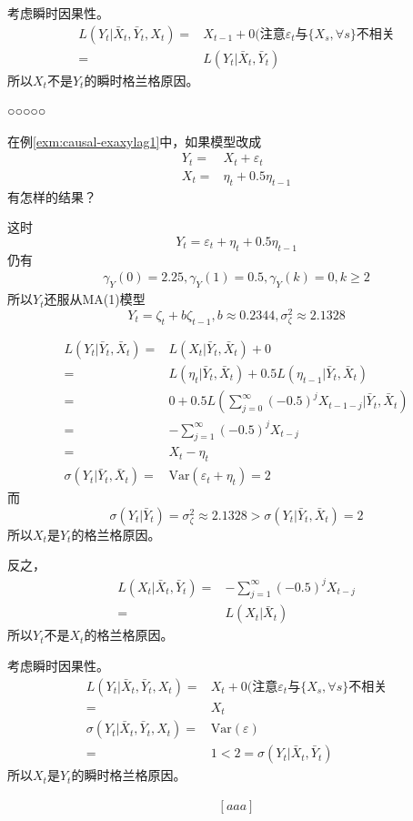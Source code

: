 \documentclass[]{book}
\theoremstyle{definition}
\theoremstyle{definition}
\theoremstyle{definition}
\theoremstyle{remark}
\let\BeginKnitrBlock\begin \let\EndKnitrBlock\end
\begin{document}
考虑瞬时因果性。 \[\begin{aligned}
L(Y_t | \bar X_t, \bar Y_t, X_t)
=& X_{t-1} + 0 (\text{注意}\varepsilon_t\text{与}\{X_s, \forall s\}\text{不相关} \\
=& L(Y_t | \bar X_t, \bar Y_t)
\end{aligned}\] 所以\(X_t\)不是\(Y_t\)的瞬时格兰格原因。

○○○○○

\BeginKnitrBlock{example}
\protect\hypertarget{exm:causal-exaxylag2}{}{\label{exm:causal-exaxylag2}
}在例\ref{exm:causal-exaxylag1}中，如果模型改成 \[\begin{aligned}
Y_t =& X_{t} + \varepsilon_t \\
X_t =& \eta_t + 0.5 \eta_{t-1}
\end{aligned}\] 有怎样的结果？
\EndKnitrBlock{example}

这时 \[
Y_t = \varepsilon_t + \eta_t + 0.5 \eta_{t-1}
\] 仍有 \[\begin{aligned}
\gamma_Y(0) = 2.25,
\gamma_Y(1) = 0.5,
\gamma_Y(k) = 0, k \geq 2
\end{aligned}\] 所以\(Y_t\)还服从MA(1)模型 \[
Y_t = \zeta_t + b \zeta_{t-1},
b \approx 0.2344,
\sigma^2_\zeta \approx 2.1328
\]

\[\begin{aligned}
L(Y_t | \bar Y_t, \bar X_t)
=& L(X_t | \bar Y_t, \bar X_t) + 0 \\
=& L(\eta_t | \bar Y_t, \bar X_t)
+ 0.5 L(\eta_{t-1} | \bar Y_t, \bar X_t) \\
=& 0 + 0.5 L(\sum_{j=0}^\infty (-0.5)^j X_{t-1-j} | \bar Y_t, \bar X_t) \\
=& - \sum_{j=1}^\infty (-0.5)^j X_{t-j} \\
=& X_t - \eta_t \\
\sigma(Y_t | \bar Y_t, \bar X_t) 
=& \text{Var}(\varepsilon_t + \eta_t) = 2
\end{aligned}\] 而 \[
\sigma(Y_t | \bar Y_t)
= \sigma^2_\zeta \approx 2.1328
> \sigma(Y_t | \bar Y_t, \bar X_t) = 2
\] 所以\(X_t\)是\(Y_t\)的格兰格原因。

反之， \[\begin{aligned}
L(X_t | \bar X_t, \bar Y_t)
=& - \sum_{j=1}^\infty (-0.5)^j X_{t-j} \\
=& L(X_t | \bar X_t)
\end{aligned}\] 所以\(Y_t\)不是\(X_t\)的格兰格原因。

考虑瞬时因果性。 \[\begin{aligned}
L(Y_t | \bar X_t, \bar Y_t, X_t)
=& X_{t} + 0 (\text{注意}\varepsilon_t\text{与}\{X_s, \forall s\}\text{不相关} \\
=& X_t \\
\sigma(Y_t | \bar X_t, \bar Y_t, X_t)
=& \text{Var}(\varepsilon) \\
=& 1 < 2 = \sigma(Y_t | \bar X_t, \bar Y_t)
\end{aligned}\] 所以\(X_t\)是\(Y_t\)的瞬时格兰格原因。

\[\begin{aligned}
[aaa]
\end{aligned}\]


\end{document}
